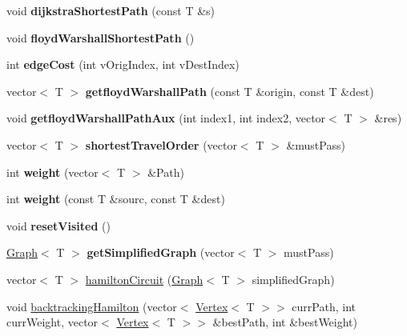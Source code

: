 \begin{DoxyCompactItemize}
\item 
void {\bfseries dijkstra\+Shortest\+Path} (const T \&s)\hypertarget{class_graph_a445a38cf4045797198eae2b818b602de}{}\label{class_graph_a445a38cf4045797198eae2b818b602de}

\item 
void {\bfseries floyd\+Warshall\+Shortest\+Path} ()\hypertarget{class_graph_ae5161f4408bf1ead2b29d19d67fb04ee}{}\label{class_graph_ae5161f4408bf1ead2b29d19d67fb04ee}

\item 
int {\bfseries edge\+Cost} (int v\+Orig\+Index, int v\+Dest\+Index)\hypertarget{class_graph_a7e137f1ef838395ac1044a944fa54448}{}\label{class_graph_a7e137f1ef838395ac1044a944fa54448}

\item 
vector$<$ T $>$ {\bfseries getfloyd\+Warshall\+Path} (const T \&origin, const T \&dest)\hypertarget{class_graph_ab23d1dae92a7f2b29dcb91a94336674c}{}\label{class_graph_ab23d1dae92a7f2b29dcb91a94336674c}

\item 
void {\bfseries getfloyd\+Warshall\+Path\+Aux} (int index1, int index2, vector$<$ T $>$ \&res)\hypertarget{class_graph_aad1eda4beb8425d03ed1f3b8af397563}{}\label{class_graph_aad1eda4beb8425d03ed1f3b8af397563}

\item 
vector$<$ T $>$ {\bfseries shortest\+Travel\+Order} (vector$<$ T $>$ \&must\+Pass)\hypertarget{class_graph_a87f186d03c40817d1631c1ddc78f5000}{}\label{class_graph_a87f186d03c40817d1631c1ddc78f5000}

\item 
int {\bfseries weight} (vector$<$ T $>$ \&Path)\hypertarget{class_graph_a63e4cc28b228bea717f6f45b60e453ab}{}\label{class_graph_a63e4cc28b228bea717f6f45b60e453ab}

\item 
int {\bfseries weight} (const T \&sourc, const T \&dest)\hypertarget{class_graph_a7a2902d5a19c13f89813851c7beea057}{}\label{class_graph_a7a2902d5a19c13f89813851c7beea057}

\item 
void {\bfseries reset\+Visited} ()\hypertarget{class_graph_ada2ab6b203763588b7f9a8e7ad8a2102}{}\label{class_graph_ada2ab6b203763588b7f9a8e7ad8a2102}

\item 
\hyperlink{class_graph}{Graph}$<$ T $>$ {\bfseries get\+Simplified\+Graph} (vector$<$ T $>$ must\+Pass)\hypertarget{class_graph_aa0ea7e496edad20c62194a360a5b3a3a}{}\label{class_graph_aa0ea7e496edad20c62194a360a5b3a3a}

\item 
vector$<$ T $>$ \hyperlink{class_graph_a55e9480d62319dce606147b86056f59a}{hamilton\+Circuit} (\hyperlink{class_graph}{Graph}$<$ T $>$ simplified\+Graph)
\item 
void \hyperlink{class_graph_a8047fd7fa6f096f18567c8369de9000e}{backtracking\+Hamilton} (vector$<$ \hyperlink{class_vertex}{Vertex}$<$ T $>$$>$ curr\+Path, int curr\+Weight, vector$<$ \hyperlink{class_vertex}{Vertex}$<$ T $>$$>$ \&best\+Path, int \&best\+Weight)
\end{DoxyCompactItemize}


